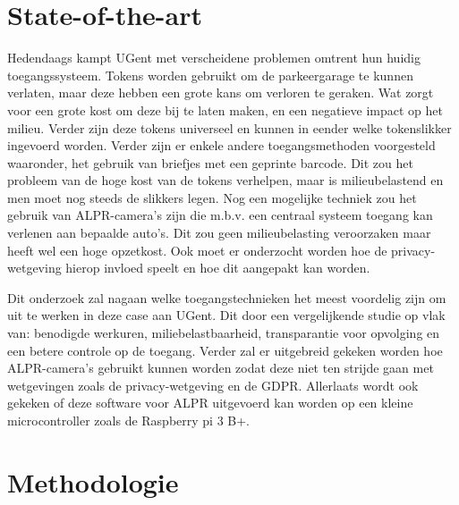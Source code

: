 
\section{State-of-the-art}
\label{sec:state-of-the-art}


Hedendaags kampt UGent met verscheidene problemen omtrent hun huidig toegangssysteem. Tokens worden gebruikt om de parkeergarage te kunnen verlaten, maar deze hebben een grote kans om verloren te geraken. Wat zorgt voor een grote kost om deze bij te laten maken, en een negatieve impact op het milieu. Verder zijn deze tokens universeel en kunnen in eender welke tokenslikker ingevoerd worden.
Verder zijn er enkele andere toegangsmethoden voorgesteld waaronder, het gebruik van briefjes met een geprinte barcode. Dit zou het probleem van de hoge kost van de tokens verhelpen, maar is milieubelastend en men moet nog steeds de slikkers legen.
Nog een mogelijke techniek zou het gebruik van ALPR-camera's zijn die m.b.v. een centraal systeem toegang kan verlenen aan bepaalde auto's. Dit zou geen milieubelasting veroorzaken maar heeft wel een hoge opzetkost. Ook moet er onderzocht worden hoe de privacy-wetgeving hierop invloed speelt en hoe dit aangepakt kan worden.

Dit onderzoek zal nagaan welke toegangstechnieken het meest voordelig zijn om uit te werken in deze case aan UGent. Dit door een vergelijkende studie op vlak van: benodigde werkuren, miliebelastbaarheid, transparantie voor opvolging en een betere controle op de toegang. Verder zal er uitgebreid gekeken worden hoe ALPR-camera's gebruikt kunnen worden zodat deze niet ten strijde gaan met wetgevingen zoals de privacy-wetgeving en de GDPR. Allerlaats wordt ook gekeken of deze software voor ALPR uitgevoerd kan worden op een kleine microcontroller zoals de Raspberry pi 3 B+.


\section{Methodologie}
\label{sec:methodologie}

